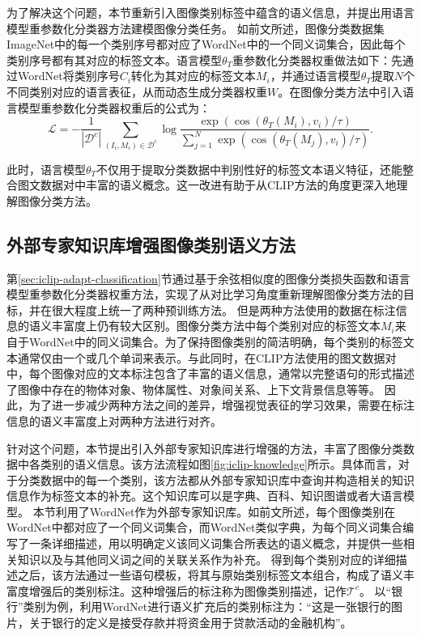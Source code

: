 为了解决这个问题，本节重新引入图像类别标签中蕴含的语义信息，并提出用语言模型重参数化分类器方法建模图像分类任务。
如前文所述，图像分类数据集ImageNet中的每一个类别序号都对应了WordNet中的一个同义词集合，因此每个类别序号都有其对应的标签文本。语言模型$\theta_{T}$重参数化分类器权重做法如下：先通过WordNet将类别序号$C_{i}$转化为其对应的标签文本$M_{i}$，并通过语言模型$\theta_{T}$提取$N$个不同类别对应的语言表征，从而动态生成分类器权重$W$。在图像分类方法中引入语言模型重参数化分类器权重后的公式为：
\begin{equation}
    \mathcal{L}=-\frac{1}{\left|\mathcal{D}^{c}\right|} \sum_{\left(I_{i}, M_{i}\right) \in \mathcal{D}^{c}} \log \frac{\exp \left(\cos \left(\theta_{T}\left(M_{i}\right), v_{i}\right) / \tau\right)}{\sum_{j=1}^{N} \exp \left(\cos \left(\theta_{T}\left(M_{j}\right), v_{i}\right) / \tau\right)}.
    \label{eq:iclip-wo-dictionary}
\end{equation}

此时，语言模型$\theta_{T}$不仅用于提取分类数据中判别性好的标签文本语义特征，还能整合图文数据对中丰富的语义概念。这一改进有助于从CLIP方法的角度更深入地理解图像分类方法。

\subsection{外部专家知识库增强图像类别语义方法} 

第\ref{sec:iclip-adapt-classification}节通过基于余弦相似度的图像分类损失函数和语言模型重参数化分类器权重方法，实现了从对比学习角度重新理解图像分类方法的目标，并在很大程度上统一了两种预训练方法。
但是两种方法使用的数据在标注信息的语义丰富度上仍有较大区别。图像分类方法中每个类别对应的标签文本$M_i$来自于WordNet中的同义词集合。为了保持图像类别的简洁明确，每个类别的标签文本通常仅由一个或几个单词来表示。与此同时，在CLIP方法使用的图文数据对中，每个图像对应的文本标注包含了丰富的语义信息，通常以完整语句的形式描述了图像中存在的物体对象、物体属性、对象间关系、上下文背景信息等等。
因此，为了进一步减少两种方法之间的差异，增强视觉表征的学习效果，需要在标注信息的语义丰富度上对两种方法进行对齐。

针对这个问题，本节提出引入外部专家知识库进行增强的方法，丰富了图像分类数据中各类别的语义信息。该方法流程如图\ref{fig:iclip-knowledge}所示。具体而言，对于分类数据中的每一个类别，该方法都从外部专家知识库中查询并构造相关的知识信息作为标签文本的补充。这个知识库可以是字典、百科、知识图谱或者大语言模型。
本节利用了WordNet作为外部专家知识库。如前文所述，每个图像类别在WordNet中都对应了一个同义词集合，而WordNet类似字典，为每个同义词集合编写了一条详细描述，用以明确定义该同义词集合所表达的语义概念，并提供一些相关知识以及与其他同义词之间的关联关系作为补充。
得到每个类别对应的详细描述之后，该方法通过一些语句模板，将其与原始类别标签文本组合，构成了语义丰富度增强后的类别标注。这种增强后的标注称为图像类别描述，记作$\mathcal{T}^{c}$。
以“银行”类别为例，利用WordNet进行语义扩充后的类别标注为：“这是一张银行的图片，关于银行的定义是接受存款并将资金用于贷款活动的金融机构”。

